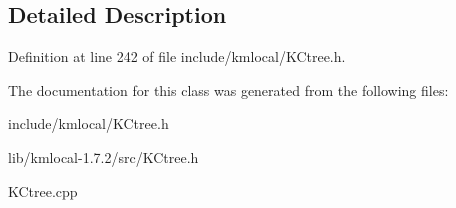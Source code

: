 \subsection{Detailed Description}


Definition at line 242 of file include/kmlocal/KCtree.h.



The documentation for this class was generated from the following files:\begin{DoxyCompactItemize}
\item 
include/kmlocal/KCtree.h\item 
lib/kmlocal-\/1.7.2/src/KCtree.h\item 
KCtree.cpp\end{DoxyCompactItemize}
